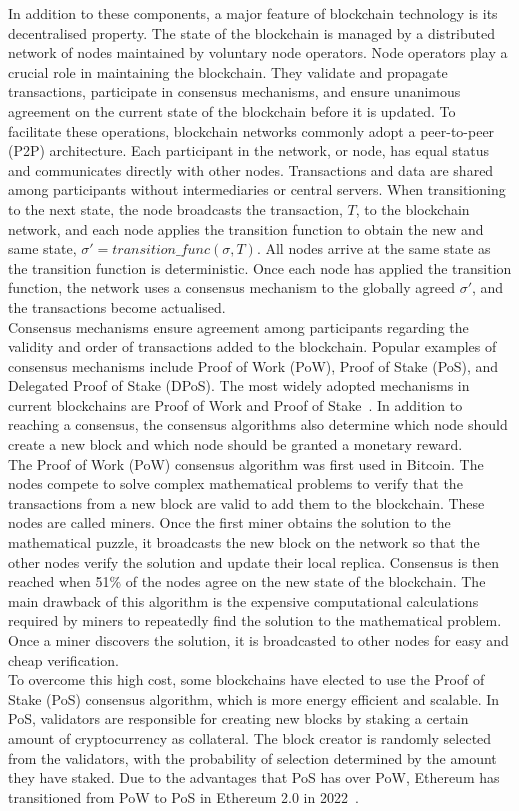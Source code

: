 \noindent In addition to these components, a major feature of blockchain technology is its decentralised property. The state of the blockchain is managed by a distributed network of nodes maintained by voluntary node operators. Node operators play a crucial role in maintaining the blockchain. They validate and propagate transactions, participate in consensus mechanisms, and ensure unanimous agreement on the current state of the blockchain before it is updated. To facilitate these operations, blockchain networks commonly adopt a peer-to-peer (P2P) architecture. Each participant in the network, or node, has equal status and communicates directly with other nodes. Transactions and data are shared among participants without intermediaries or central servers. When transitioning to the next state, the node broadcasts the transaction, $T$, to the blockchain network, and each node applies the transition function to obtain the new and same state, $\sigma' = transition\_func(\sigma, T)$. All nodes arrive at the same state as the transition function is deterministic. Once each node has applied the transition function, the network uses a consensus mechanism to the globally agreed $\sigma'$, and the transactions become actualised.
\\[3mm]
Consensus mechanisms ensure agreement among participants regarding the validity and order of transactions added to the blockchain. Popular examples of consensus mechanisms include Proof of Work (PoW), Proof of Stake (PoS), and Delegated Proof of Stake (DPoS). The most widely adopted mechanisms in current blockchains are Proof of Work and Proof of Stake~\cite{noauthor_consensus_nodate}. In addition to reaching a consensus, the consensus algorithms also determine which node should create a new block and which node should be granted a monetary reward.
\\[3mm]
The Proof of Work (PoW) consensus algorithm was first used in Bitcoin. The nodes compete to solve complex mathematical problems to verify that the transactions from a new block are valid to add them to the blockchain. These nodes are called miners. Once the first miner obtains the solution to the mathematical puzzle, it broadcasts the new block on the network so that the other nodes verify the solution and update their local replica. Consensus is then reached when 51\% of the nodes agree on the new state of the blockchain. The main drawback of this algorithm is the expensive computational calculations required by miners to repeatedly find the solution to the mathematical problem. Once a miner discovers the solution, it is broadcasted to other nodes for easy and cheap verification.
\\[3mm]
To overcome this high cost, some blockchains have elected to use the Proof of Stake (PoS) consensus algorithm, which is more energy efficient and scalable. In PoS, validators are responsible for creating new blocks by staking a certain amount of cryptocurrency as collateral. The block creator is randomly selected from the validators, with the probability of selection determined by the amount they have staked. Due to the advantages that PoS has over PoW, Ethereum has transitioned from PoW to PoS in Ethereum 2.0 in 2022~\cite{noauthor_proof--stake_nodate}.

